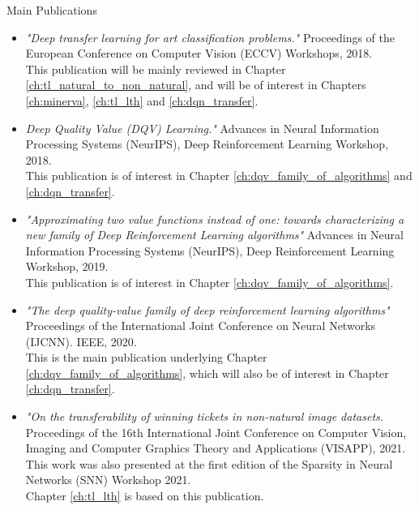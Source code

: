 \begin{remark}{Main Publications}
\begin{itemize}
	\item \citet{sabatelli2018deep} \textit{"Deep transfer learning for art classification problems."} Proceedings of the European Conference on Computer Vision (ECCV) Workshops, 2018.
	\\ This publication will be mainly reviewed in Chapter \ref{ch:tl_natural_to_non_natural}, and will be of interest in Chapters \ref{ch:minerva}, \ref{ch:tl_lth} and \ref{ch:dqn_transfer}.

	\item \citet{sabatelli2018deepqv} \textit{Deep Quality Value (DQV) Learning."} Advances in Neural Information Processing Systems (NeurIPS), Deep Reinforcement Learning Workshop, 2018.
	\\ This publication is of interest in Chapter \ref{ch:dqv_family_of_algorithms} and \ref{ch:dqn_transfer}.

	\item \citet{sabatelli2019approximating}  \textit{"Approximating two value functions instead of one: towards characterizing a new family of Deep Reinforcement Learning algorithms"} Advances in Neural Information Processing Systems (NeurIPS), Deep Reinforcement Learning Workshop, 2019. \\
	This publication is of interest in Chapter \ref{ch:dqv_family_of_algorithms}.
	
	\item \citet{sabatelli2020deep} \textit{"The deep quality-value family of deep reinforcement learning algorithms"} Proceedings of the International Joint Conference on Neural Networks (IJCNN). IEEE, 2020.
	\\ This is the main publication underlying Chapter \ref{ch:dqv_family_of_algorithms}, which will also be of interest in Chapter \ref{ch:dqn_transfer}.

	\item \citet{sabatelli2020transferability} \textit{"On the transferability of winning tickets in non-natural image datasets.} Proceedings of the 16th International Joint Conference on Computer Vision, Imaging and Computer Graphics Theory and Applications (VISAPP), 2021.
	\\ This work was also presented at the first edition of the Sparsity in Neural Networks (SNN) Workshop 2021.
	\\ Chapter \ref{ch:tl_lth} is based on this publication.


\end{itemize}
\end{remark}
